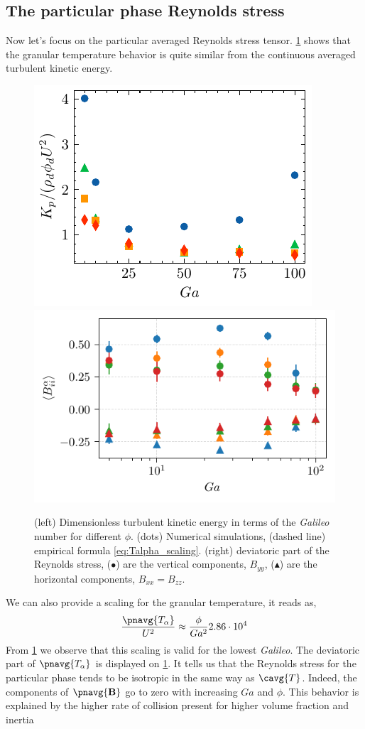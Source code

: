 \subsection{The particular phase Reynolds stress}
Now let's focus on the particular averaged Reynolds stress tensor.
\ref{fig:Talpha_Balpha} shows that the granular temperature behavior is quite similar from the continuous averaged turbulent kinetic energy.
\begin{figure}[h!]
    \centering
    \includegraphics[height=0.3\textwidth]{image/HOMOGENEOUS/fPA/Talpha.pdf}
    \includegraphics[height=0.3\textwidth]{image/HOMOGENEOUS/fPA/Bf.pdf}
    \caption{(left) Dimensionless turbulent kinetic energy in terms of the \textit{Galileo} number for different $\phi$. (dots) Numerical simulations, (dashed line) empirical formula \ref{eq:Talpha_scaling}.
    (right) deviatoric part of the Reynolds stress, ($\bullet$) are the vertical components, $B_{yy}$, ($\blacktriangle$) are the horizontal components, $B_{xx} = B_{zz}$.}
    \label{fig:Talpha_Balpha}
\end{figure}
We can also provide a scaling for the granular temperature, it reads as,  
\begin{equation}
    \frac{\pnavg{T_\alpha}}{U^2}  \approx \frac{\phi}{Ga^2} 2.86\cdot10^{4} 
    \label{eq:Talpha_scaling}
\end{equation}
From \ref{fig:Talpha_Balpha} we observe that this scaling is valid for the lowest \textit{Galileo}. 
The deviatoric part of $\pnavg{T_\alpha}$ is displayed on \ref{fig:Talpha_Balpha}.
It tells us that the Reynolds stress for the particular phase tends to be isotropic in the same way as $\cavg{T}$. 
Indeed, the components of $\pnavg{\textbf{B}}$ go to zero with increasing $Ga$ and $\phi$. 
This behavior is explained by the higher rate of collision present for higher volume fraction and inertia \citep[chapter 1]{jackson2000dynamics}